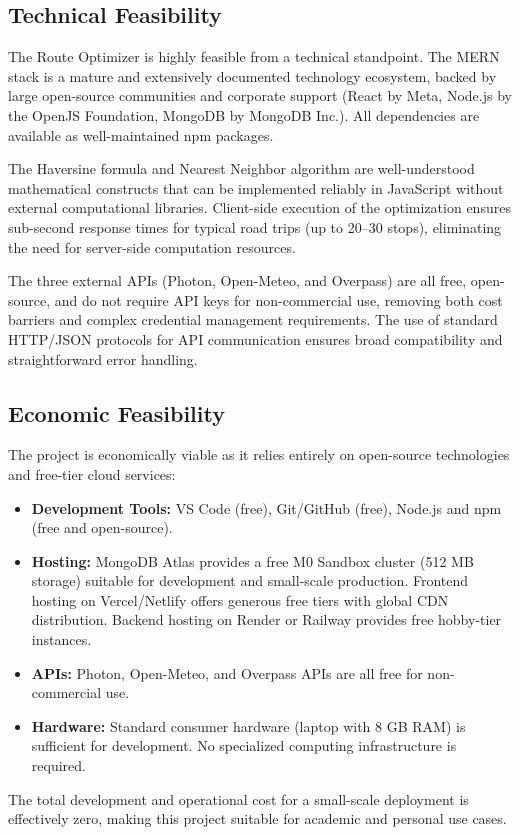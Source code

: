 \subsection{Technical Feasibility}
The Route Optimizer is highly feasible from a technical standpoint. The MERN stack is a mature and extensively documented technology ecosystem, backed by large open-source communities and corporate support (React by Meta, Node.js by the OpenJS Foundation, MongoDB by MongoDB Inc.). All dependencies are available as well-maintained npm packages.

The Haversine formula and Nearest Neighbor algorithm are well-understood mathematical constructs that can be implemented reliably in JavaScript without external computational libraries. Client-side execution of the optimization ensures sub-second response times for typical road trips (up to 20--30 stops), eliminating the need for server-side computation resources.

The three external APIs (Photon, Open-Meteo, and Overpass) are all free, open-source, and do not require API keys for non-commercial use, removing both cost barriers and complex credential management requirements. The use of standard HTTP/JSON protocols for API communication ensures broad compatibility and straightforward error handling.

\subsection{Economic Feasibility}
The project is economically viable as it relies entirely on open-source technologies and free-tier cloud services:
\begin{itemize}
    \item \textbf{Development Tools:} VS Code (free), Git/GitHub (free), Node.js and npm (free and open-source).
    \item \textbf{Hosting:} MongoDB Atlas provides a free M0 Sandbox cluster (512 MB storage) suitable for development and small-scale production. Frontend hosting on Vercel/Netlify offers generous free tiers with global CDN distribution. Backend hosting on Render or Railway provides free hobby-tier instances.
    \item \textbf{APIs:} Photon, Open-Meteo, and Overpass APIs are all free for non-commercial use.
    \item \textbf{Hardware:} Standard consumer hardware (laptop with 8 GB RAM) is sufficient for development. No specialized computing infrastructure is required.
\end{itemize}
The total development and operational cost for a small-scale deployment is effectively zero, making this project suitable for academic and personal use cases.


